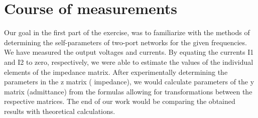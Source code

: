 \documentclass[notitlepage, a4paper, 11pt]{article}
\begin{document}
	\section{Course of measurements}  
	Our goal in the first part of the exercise, was to familiarize with the methods of determining the self-parameters of
two-port networks for the given frequencies. We have measured the output voltages and currents. By equating the currents I1 and I2 to zero, respectively, we were able to estimate the values of the individual elements of the impedance matrix. After experimentally determining the parameters in the z matrix ( impedance), we would calculate parameters of the y matrix (admittance) from the formulas allowing for transformations between the respective matrices. The end of our work would be comparing the obtained results with
theoretical calculations.
\end{document}
